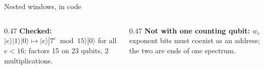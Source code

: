 \documentclass[aspectratio=169,11pt]{beamer}
\newcommand{\code}[2][]{}
\begin{document}
\setcounter{framenumber}{61}
\begin{frame}[fragile]{Nested windows, in code}
  \code[basicstyle=\ttfamily\fontsize{7.6}{8.8}\selectfont]{nested.py}
  \begin{columns}[T]
    \begin{column}{0.47\textwidth}
      {\small\textbf{Checked:} $|e\rangle|1\rangle|0\rangle\mapsto|e\rangle|7^e\bmod15\rangle|0\rangle$ for all $e<16$; factors 15 on 23 qubits, 2 multiplications.}
    \end{column}
    \begin{column}{0.47\textwidth}
      {\small\textbf{Not with one counting qubit:} $w_e$ exponent bits must coexist as an address; the two are ends of one spectrum.}
    \end{column}
  \end{columns}
\end{frame}
\end{document}
